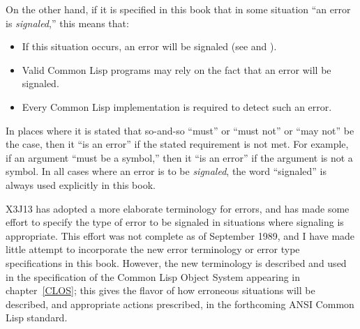 On the other hand, if it is specified in this book that in some situation
``an error is \emph{signaled},'' this means that:

\begin{itemize}
\item If this situation occurs, an error will be signaled
(see  and ).

\item Valid Common Lisp programs may rely on the fact that an error will be
signaled.

\item Every Common Lisp implementation is required to detect such an error.
\end{itemize}

In places where it is stated that so-and-so ``must'' or ``must not''
or ``may not''  be the case, then it ``is an error'' if the stated requirement
is not met.  For example, if an argument ``must be a symbol,'' then it
``is an error'' if the argument is not a symbol.  In all cases where
an error is to be \emph{signaled}, the word ``signaled'' is always used
explicitly in this book.

\begin{newer}
X3J13 has adopted a more elaborate terminology for errors,
and has made some effort to specify the type of error to be signaled
in situations where signaling is appropriate.  This effort
was not complete as of September 1989, and I have made little
attempt to incorporate the new error terminology or
error type specifications in this book.  However, the new terminology
is described and used in the specification of the
Common Lisp Object System appearing in chapter~\ref{CLOS}; this gives
the flavor of how erroneous situations will be described,
and appropriate actions prescribed, in the forthcoming ANSI Common
Lisp standard.
\end{newer}

